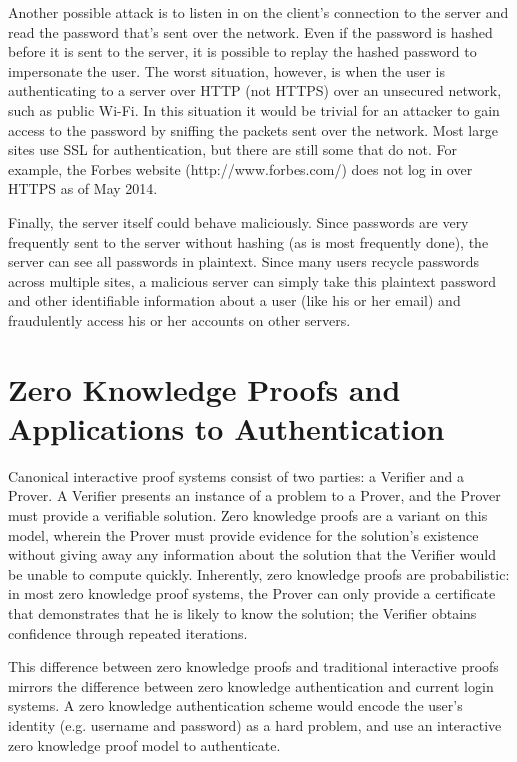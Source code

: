 \documentclass[11pt]{article}
\begin{document}
Another possible attack is to listen in on the client’s connection to the server and read the password that’s sent over the network.  Even if the password is hashed before it is sent to the server, it is possible to replay the hashed password to impersonate the user.  The worst situation, however, is when the user is authenticating to a server over HTTP (not HTTPS) over an unsecured network, such as public Wi-Fi.  In this situation it would be trivial for an attacker to gain access to the password by sniffing the packets sent over the network. Most large sites use SSL for authentication, but there are still some that do not.  For example, the Forbes website (http://www.forbes.com/) does not log in over HTTPS as of May 2014.

Finally, the server itself could behave maliciously. Since passwords are very frequently sent to the server without hashing (as is most frequently done), the server can see all passwords in plaintext. Since many users recycle passwords across multiple sites, a malicious server can simply take this plaintext password and other identifiable information about a user (like his or her email) and fraudulently access his or her accounts on other servers.

\section{Zero Knowledge Proofs and Applications to Authentication}

Canonical interactive proof systems consist of two parties: a Verifier and a Prover.  A Verifier presents an instance of a problem to a Prover, and the Prover must provide a verifiable solution.  Zero knowledge proofs are a variant on this model, wherein the Prover must provide evidence for the solution’s existence without giving away any information about the solution that the Verifier would be unable to compute quickly.  Inherently, zero knowledge proofs are probabilistic: in most zero knowledge proof systems, the Prover can only provide a certificate that demonstrates that he is likely to know the solution; the Verifier obtains confidence through repeated iterations.

This difference between zero knowledge proofs and traditional interactive proofs mirrors the difference between zero knowledge authentication and current login systems.  A zero knowledge authentication scheme would encode the user’s identity (e.g. username and password) as a hard problem, and use an interactive zero knowledge proof model to authenticate.
\end{document}

